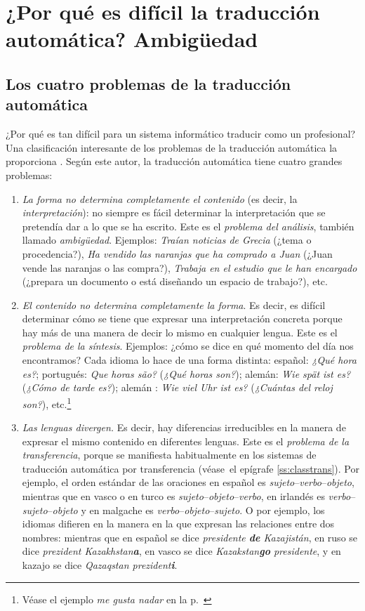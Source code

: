 \chapter[¿Por qué es difícil la TA? Ambigüedad]{¿Por qué es difícil la traducción automática? Ambigüedad} \label{se:ambig} 

\section{Los cuatro problemas de la traducción automática} ¿Por qué es tan difícil para un sistema informático traducir como un profesional? Una clasificación interesante de los problemas de la traducción automática la proporciona \cite{arnold03p}. Según este autor, la traducción automática tiene cuatro grandes problemas: \begin{enumerate} \item \emph{La forma no determina completamente el contenido} (es decir, la \emph{interpretación}): no siempre es fácil determinar la interpretación que se pretendía dar a lo que se ha escrito. Este es el \emph{problema del análisis}, también llamado \emph{ambigüedad}. Ejemplos: \emph{Traían noticias de Grecia} (¿tema o procedencia?), \emph{Ha vendido las naranjas que ha comprado a Juan} (¿Juan vende las naranjas o las compra?), \emph{Trabaja en el estudio que le han encargado} (¿prepara un documento o está diseñando un espacio de trabajo?), etc. 

\item \emph{El contenido no determina completamente la forma}. Es decir, es difícil determinar cómo se tiene que expresar una interpretación concreta porque hay más de una manera de decir lo mismo en cualquier lengua. Este es el \emph{problema de la síntesis}. Ejemplos: ¿cómo se dice en qué momento del día nos encontramos? Cada idioma lo hace de una forma distinta: español: \emph{¿Qué hora es?}; portugués: \emph{Que horas são?} (\emph{¿Qué horas son?}); alemán: \emph{Wie spät ist es?} (\emph{¿Cómo de tarde es?}); alemán : \emph{Wie viel Uhr ist es?} (\emph{¿Cuántas del reloj son?}), etc.\footnote{Véase el ejemplo \emph{me gusta nadar} en la p.~\pageref{pg:magradanadar}} 

\item \emph{Las lenguas divergen.} Es decir, hay diferencias irreducibles en la manera de expresar el mismo contenido en diferentes lenguas. Este es el \emph{problema de la transferencia}, porque se manifiesta habitualmente en los sistemas de traducción automática por transferencia (véase~el epígrafe \ref{ss:classtrans}). Por ejemplo, el orden estándar de las oraciones en español es \emph{sujeto}--\emph{verbo}--\emph{objeto}, mientras que en vasco o en turco es \emph{sujeto}--\emph{objeto}--\emph{verbo}, en irlandés es \emph{verbo}--\emph{sujeto}--\emph{objeto} y en malgache es \emph{verbo}--\emph{objeto}--\emph{sujeto}. O por ejemplo, los idiomas difieren en la manera en la que expresan las relaciones entre dos nombres: mientras que en español se dice \emph{presidente \textbf{de} Kazajistán}, en ruso se dice \emph{prezident Kazakhstan\textbf{a}}, en vasco se dice \emph{Kazakstan\textbf{go} presidente}, y en kazajo se dice \emph{Qazaqstan prezident\textbf{i}}. 


\end{enumerate}
